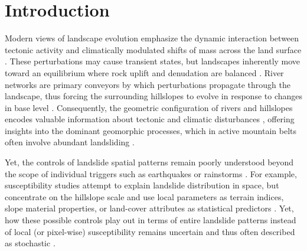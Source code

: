 \documentclass[draft]{agujournal2019}
\begin{document}
\section{Introduction}
\par Modern views of landscape evolution emphasize the dynamic interaction between tectonic activity and climatically modulated shifts of mass across the land surface \cite{Davies2021, Whittaker2012, Irasema2002}. These perturbations may cause transient states, but landscapes inherently move toward an equilibrium where rock uplift and denudation are balanced  \cite{Whittaker2012, Wobus2006, Whipple2004}. River networks are primary conveyors by which perturbations propagate through the landscape, thus forcing the surrounding hillslopes to evolve in response to changes in base level \cite{Whipple2004, howard1994}. Consequently, the geometric configuration of rivers and hillslopes encodes valuable information about tectonic and climatic disturbances \cite{whipple2017, stock1999}, offering insights into the dominant geomorphic processes, which in active mountain belts often involve abundant landsliding \cite{Larsen2012, korup2010, Montgomery2002, Campforts2020, Broeckx2020}.

\par  Yet, the controls of landslide spatial patterns remain poorly understood beyond the scope of individual triggers such as earthquakes or rainstorms \cite{yanites2018}. For example, susceptibility studies attempt to explain landslide distribution in space, but concentrate on the hillslope scale and use local parameters as terrain indices, slope material properties, or land-cover attributes as statistical predictors \cite{reichenbach2018, soeters1996, montgomery1994}. Yet, how these possible controls play out in terms of entire landslide patterns instead of local (or pixel-wise) susceptibility remains uncertain and thus often described as stochastic \cite{Benda1997}. 
\end{document}

